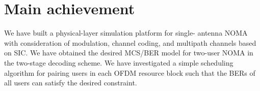 \section{Main achievement}
\label{sec_main_achievement}
We have built a physical-layer simulation platform for single-
antenna NOMA with consideration of modulation, channel coding,
and multipath channels based on SIC.
We have obtained the desired MCS/BER model for two-user
NOMA in the two-stage decoding scheme.
We have investigated a simple scheduling algorithm for pairing
users in each OFDM resource block such that the BERs of all
users can satisfy the desired constraint.

